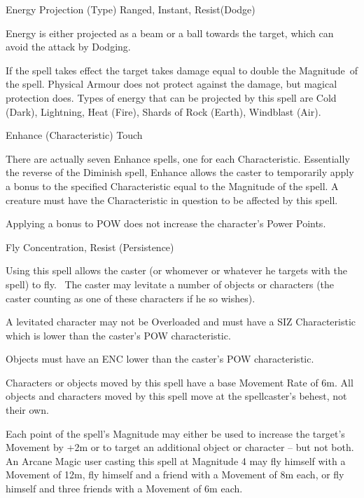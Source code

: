 \begin{rpg-spell}
{Energy Projection (Type)}
{Ranged, Instant, Resist(Dodge)}

Energy is either projected as a beam or a ball towards the target, which can avoid the attack by Dodging.

If the spell takes effect the target takes damage equal to double the Magnitude of the spell. Physical Armour does not protect against the damage, but magical protection does. Types of energy that can be projected by this spell are Cold (Dark), Lightning, Heat (Fire), Shards of Rock (Earth), Windblast (Air).
\end{rpg-spell}


\begin{rpg-spell}
{Enhance (Characteristic)}
{Touch}

There are actually seven Enhance spells, one for each Characteristic. Essentially the reverse of the Diminish spell, Enhance allows the caster to temporarily apply a bonus to the specified Characteristic equal to the Magnitude of the spell. A creature must have the Characteristic in question to be affected by this spell. 

Applying a bonus to POW does not increase the character’s Power Points. 
\end{rpg-spell}


\begin{rpg-spell}
{Fly}
{Concentration, Resist (Persistence)}

Using this spell allows the caster (or whomever or whatever he targets with the spell) to fly.  The caster may levitate a number of objects or characters (the caster counting as one of these characters if he so wishes). 

A levitated character may not be Overloaded and must have a SIZ Characteristic which is lower than the caster’s POW characteristic. 

Objects must have an ENC lower than the caster’s POW characteristic. 

Characters or objects moved by this spell have a base Movement Rate of 6m. All objects and characters moved by this spell move at the spellcaster’s behest, not their own. 

Each point of the spell’s Magnitude may either be used to increase the target’s Movement by +2m or to target an additional object or character – but not both. An Arcane Magic user casting this spell at Magnitude 4 may fly himself with a Movement of 12m, fly himself and a friend with a Movement of 8m each, or fly himself and three friends with a Movement of 6m each.
\end{rpg-spell}


